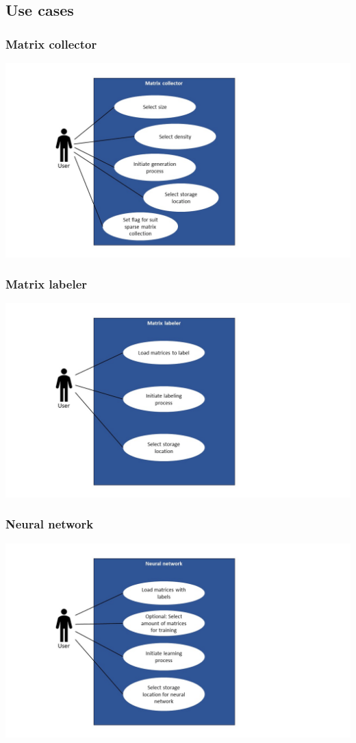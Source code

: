 \documentclass[parskip=full]{scrartcl}
\begin{document}
\subsection{Use cases}
\subsubsection{Matrix \gls{collector}}
\includegraphics[width=1.3\textwidth]{useCase_collector}
\subsubsection{Matrix labeler}
\includegraphics[width=1.3\textwidth]{useCase_Labeler}
\subsubsection{\gls{Neural network}}
\includegraphics[width=1.3\textwidth]{useCase_NeuralNetwork}
\end{document}
